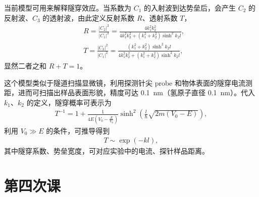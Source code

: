 当前模型可用来解释隧穿效应。当系数为 $C_1$ 的入射波到达势垒后，会产生 $C_2$ 的反射波、$C_3$ 的透射波，由此定义反射系数 $R$、透射系数 $T$，
\begin{align}
    &R = \frac{|C_2|^2}{|C_1|^2} = \frac{4 k_1^2 k_2^2}{4k_1^2 k_2^2 + (k_1^2 + k_2^2) \sinh^2 k_2 l}, \\
    &T = \frac{|C_3|^2}{|C_1|^2} = \frac{(k_1^2 + k_2^2) \sinh^2 k_2 l}{4k_1^2 k_2^2 + (k_1^2 + k_2^2) \sinh^2 k_2 l},
\end{align}
显然二者之和 $R+T=1$。

这个模型类似于隧道扫描显微镜，利用探测针尖 probe 和物体表面的隧穿电流测距，进而可扫描出样品表面形貌，精度可达 \SI{0.1}{\nano\metre}（氢原子直径 \SI{0.1}{\nano\metre}）。代入 $k_1$、$k_2$ 的定义，隧穿概率可表示为
\begin{align}
    T^{-1} = 1 + \frac1{4E \left(V_0 - \frac E{V_0}\right)} \sinh^2 \left(\frac l\hbar \sqrt{2m (V_0 - E)}\right),
\end{align}
利用 $V_0 \gg E$ 的条件，可推导得到
\begin{align}
    T \sim \exp(- k l),
\end{align}
其中隧穿系数、势垒宽度，可对应实验中的电流、探针样品距离。


\section{第四次课}
